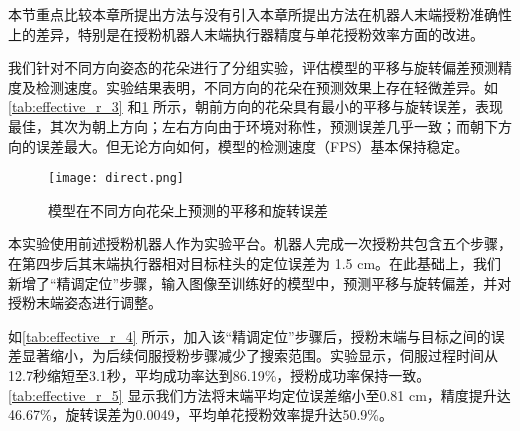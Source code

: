 本节重点比较本章所提出方法与没有引入本章所提出方法在机器人末端授粉准确性上的差异，特别是在授粉机器人末端执行器精度与单花授粉效率方面的改进。

我们针对不同方向姿态的花朵进行了分组实验，评估模型的平移与旋转偏差预测精度及检测速度。实验结果表明，不同方向的花朵在预测效果上存在轻微差异。如\cref{tab:effective_r_3} 和\cref{fig:effective_r_4} 所示，朝前方向的花朵具有最小的平移与旋转误差，表现最佳，其次为朝上方向；左右方向由于环境对称性，预测误差几乎一致；而朝下方向的误差最大。但无论方向如何，模型的检测速度（FPS）基本保持稳定。




\begin{table}[htbp]
	\caption[数据集中不同方向花朵图像的数量统计]{数据集中不同方向花朵图像的数量统计}
	\label{tab:effective_r_3}
	
\end{table}

\begin{figure}[htb]
	\texttt{[image: direct.png]}
	\caption[模型在不同方向花朵上预测的平移和旋转误差]{模型在不同方向花朵上预测的平移和旋转误差} %
	\label{fig:effective_r_4}
\end{figure}

本实验使用前述授粉机器人作为实验平台。机器人完成一次授粉共包含五个步骤，在第四步后其末端执行器相对目标柱头的定位误差为 1.5 cm。在此基础上，我们新增了“精调定位”步骤，输入图像至训练好的模型中，预测平移与旋转偏差，并对授粉末端姿态进行调整。

如\cref{tab:effective_r_4} 所示，加入该“精调定位”步骤后，授粉末端与目标之间的误差显著缩小，为后续伺服授粉步骤减少了搜索范围。实验显示，伺服过程时间从12.7秒缩短至3.1秒，平均成功率达到86.19\%，授粉成功率保持一致。\cref{tab:effective_r_5} 显示我们方法将末端平均定位误差缩小至0.81 cm，精度提升达46.67\%，旋转误差为0.0049，平均单花授粉效率提升达50.9\%。

